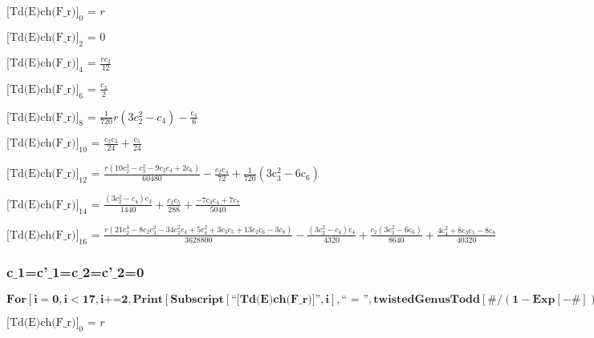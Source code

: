\documentclass{article}
\newcommand{\unicode}[1]{{}}
\begin{document}
\noindent\(\text{[Td(E)ch(F$\_$r)]}_0\text{ = }r\)

\noindent\(\text{[Td(E)ch(F$\_$r)]}_2\text{ = }0\)

\noindent\(\text{[Td(E)ch(F$\_$r)]}_4\text{ = }\frac{r c_2}{12}\)

\noindent\(\text{[Td(E)ch(F$\_$r)]}_6\text{ = }\frac{\text{c$\unicode{02bc}$}_3}{2}\)

\noindent\(\text{[Td(E)ch(F$\_$r)]}_8\text{ = }\frac{1}{720} r \left(3 c_2^2-c_4\right)-\frac{\text{c$\unicode{02bc}$}_4}{6}\)

\noindent\(\text{[Td(E)ch(F$\_$r)]}_{10}\text{ = }\frac{c_2 \text{c$\unicode{02bc}$}_3}{24}+\frac{\text{c$\unicode{02bc}$}_5}{24}\)

\noindent\(\text{[Td(E)ch(F$\_$r)]}_{12}\text{ = }\frac{r \left(10 c_2^3-c_3^2-9 c_2 c_4+2 c_6\right)}{60480}-\frac{c_2 \text{c$\unicode{02bc}$}_4}{72}+\frac{1}{720}
\left(3 \text{c$\unicode{02bc}$}_3^2-6 \text{c$\unicode{02bc}$}_6\right)\)

\noindent\(\text{[Td(E)ch(F$\_$r)]}_{14}\text{ = }\frac{\left(3 c_2^2-c_4\right) \text{c$\unicode{02bc}$}_3}{1440}+\frac{c_2 \text{c$\unicode{02bc}$}_5}{288}+\frac{-7
\text{c$\unicode{02bc}$}_3 \text{c$\unicode{02bc}$}_4+7 \text{c$\unicode{02bc}$}_7}{5040}\)

\noindent\(\text{[Td(E)ch(F$\_$r)]}_{16}\text{ = }\frac{r \left(21 c_2^4-8 c_2 c_3^2-34 c_2^2 c_4+5 c_4^2+3 c_3 c_5+13 c_2 c_6-3 c_8\right)}{3628800}-\frac{\left(3
c_2^2-c_4\right) \text{c$\unicode{02bc}$}_4}{4320}+\frac{c_2 \left(3 \text{c$\unicode{02bc}$}_3^2-6 \text{c$\unicode{02bc}$}_6\right)}{8640}+\frac{4
\text{c$\unicode{02bc}$}_4^2+8 \text{c$\unicode{02bc}$}_3 \text{c$\unicode{02bc}$}_5-8 \text{c$\unicode{02bc}$}_8}{40320}\)

\subsubsection*{c$\_$1=c{'}$\_$1=c$\_$2=c{'}$\_$2=0}

\begin{doublespace}
\noindent\(\pmb{\text{For}\left[i=0,i<17,i\text{+=}2, \text{Print}\left[\text{Subscript}[\text{{``}[Td(E)ch(F$\_$r)]{''}},i],\text{{``} = {''}},\text{twistedGenusTodd}[\#/(1-\text{Exp}[-\#])\&,i]
\text{/.}c_1\to 0\text{/.}\text{c$\unicode{02bc}$}_1\to 0\text{/.}c_2\to 0\text{/.}\text{c$\unicode{02bc}$}_2\to 0\right]\right]}\)
\end{doublespace}

\noindent\(\text{[Td(E)ch(F$\_$r)]}_0\text{ = }r\)
\end{document}
